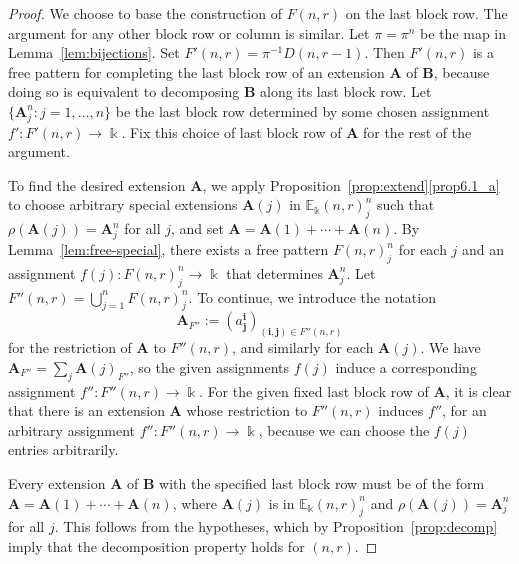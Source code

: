 \documentclass[10pt]{article}
\theoremstyle{definition}
\newcommand{\E}{\mathbb{E}}
\newcommand{\bi}{{\boldsymbol{i}}} %
\newcommand{\bj}{{\boldsymbol{j}}}
\newcommand{\bA}{\mathbf{A}}
\newcommand{\bB}{\mathbf{B}}
\begin{document}
\begin{proof} 
We choose to base the construction of $F(n,r)$ on the last block
row. The argument for any other block row or column is similar. Let
$\pi = \pi^n$ be the map in Lemma~\ref{lem:bijections}. Set $F'(n,r)
= \pi^{-1} D(n,r-1)$. Then $F'(n,r)$ is a free pattern for completing
the last block row of an extension $\bA$ of $\bB$, because doing so is
equivalent to decomposing $\bB$ along its last block row. Let $\{
\bA^n_j: j=1, \dots, n \}$ be the last block row determined by some
chosen assignment $f': F'(n,r) \to \Bbbk$. Fix this choice of last
block row of $\bA$ for the rest of the argument.

To find the desired extension $\bA$, we apply Proposition~\ref{prop:extend}\ref{prop6.1_a} to choose arbitrary special extensions $\bA(j)$
in $\E_\Bbbk(n,r)^n_j$ such that $\rho(\bA(j)) = \bA^n_j$ for all $j$,
and set $\bA = \bA(1) + \cdots + \bA(n)$. By Lemma~\ref{lem:free-special}, there exists a free pattern $F(n,r)^n_j$ for
each $j$ and an assignment $f(j): F(n,r)^n_j \to \Bbbk$ that
determines $\bA^n_j$. Let $F''(n,r) = \bigcup_{j=1}^n F(n,r)^n_j$. To
continue, we introduce the notation
\[
\bA_{F''} := (a^\bi_\bj)_{(\bi,\bj) \in F''(n,r)}
\]
for the restriction of $\bA$ to $F''(n,r)$, and similarly for each
$\bA(j)$. We have $\bA_{F''} = \sum_j \bA(j)_{F''}$, so the given
assignments $f(j)$ induce a corresponding assignment $f'': F''(n,r)
\to \Bbbk$. For the given fixed last block row of $\bA$, it is clear
that there is an extension $\bA$ whose restriction to $F''(n,r)$
induces $f''$, for an arbitrary assignment $f'': F''(n,r) \to \Bbbk$,
because we can choose the $f(j)$ entries arbitrarily.

Every extension $\bA$ of $\bB$ with the specified last block row must
be of the form $\bA = \bA(1)+\cdots +\bA(n)$, where $\bA(j)$ is in
$\E_\Bbbk(n,r)^n_j$ and $\rho(\bA(j)) = \bA^n_j$ for all $j$. This
follows from the hypotheses, which by Proposition~\ref{prop:decomp}
imply that the decomposition property holds for $(n,r)$.


\end{proof}
\end{document}
